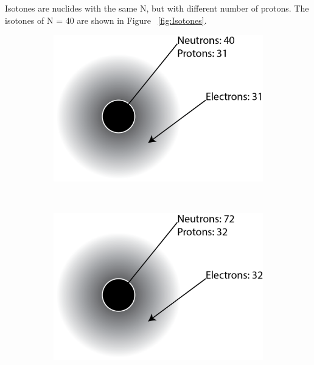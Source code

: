 \documentclass[11pt]{article}
\begin{document}
Isotones are nuclides with the same N, but with different number of protons.
The isotones of N = 40 are shown in Figure ~\ref{fig:Isotones}.
\begin{figure}[!ht]
	\centering
	\begin{subfigure}[b]{0.3\textwidth}
		\centering
		\includegraphics[width=\textwidth]{HW2_71Ga.png}
	\end{subfigure}%
	~
	\begin{subfigure}[b]{0.3\textwidth}
		\centering
		\includegraphics[width=\textwidth]{HW2_72Ge.png}
	\end{subfigure}%
	~
	\begin{subfigure}[b]{0.3\textwidth}
		\centering

\end{subfigure}
\end{figure}
\end{document}
